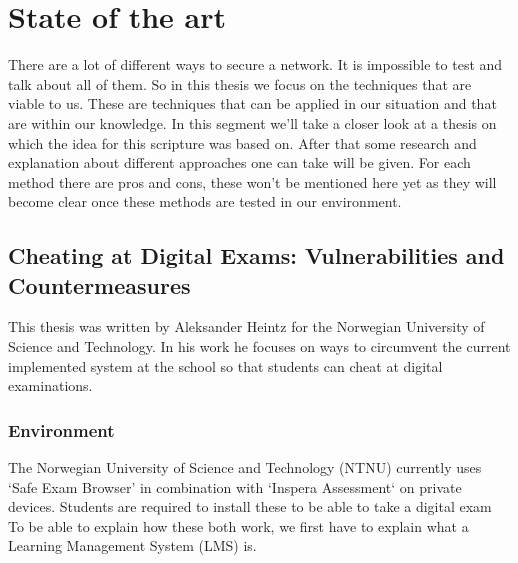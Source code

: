 \chapter{State of the art}
\label{ch:stand-van-zaken}



There are a lot of different ways to secure a network. It is impossible to test and talk about all of them. So in this thesis we focus on the techniques that are viable to us. These are techniques that can be applied in our situation and that are within our knowledge. In this segment we'll take a closer look at a thesis on which the idea for this scripture was based on. After that some research and explanation about different approaches one can take will be given. For each method there are pros and cons, these won't be mentioned here yet as they will become clear once these methods are tested in our environment.
\section{Cheating at Digital Exams: Vulnerabilities and Countermeasures}
This thesis was written by Aleksander Heintz for the Norwegian University of Science and Technology. In his work he focuses on ways to circumvent the current implemented system at the school so that students can cheat at digital examinations.
\subsection{Environment}
The Norwegian University of Science and Technology (NTNU) currently uses `Safe Exam Browser' in combination with `Inspera Assessment` on private devices. Students are required to install these to be able to take a digital exam
To be able to explain how these both work, we first have to explain what a Learning Management System (LMS) is.
